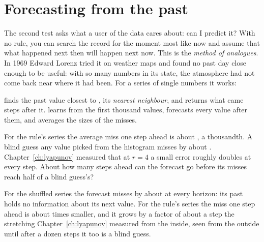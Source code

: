 \section{Forecasting from the past}
\label{sec:ch15-analogues}

\noindent
The second test asks what a user of the data cares about: can I predict it?
With no rule, you can search the record for the moment most like now and
assume that what happened next then will happen next now. This is the
\emph{method of analogues}. In 1969 Edward Lorenz tried it on weather maps
and found no past day close enough to be useful: with so many numbers in its
state, the atmosphere had not come back near where it had been. For a series
of single numbers it works:


\noindent
{} finds the past value closest to , its \emph{nearest
neighbour}, and returns what came  steps after it.
 learns from the first thousand values, forecasts every
value after them, and averages the sizes of the misses.

\begin{think}
For the rule's series the average miss one step ahead is about
, a thousandth. A blind guess \dash{} any value picked from
the histogram \dash{} misses by about .
Chapter~\ref{ch:lyapunov} measured that at $r = 4$ a small error roughly
doubles at every step. About how many steps ahead can the forecast go before
its misses reach half of a blind guess's?
\end{think}



\noindent
For the shuffled series the forecast misses by about  at
every horizon: its past holds no information about its next value. For the
rule's series the miss one step ahead is about  times
smaller, and it grows by a factor of about  a step
\dash{} the stretching Chapter~\ref{ch:lyapunov} measured from the inside,
seen from the outside \dash{} until after a dozen steps it too is a blind
guess.

